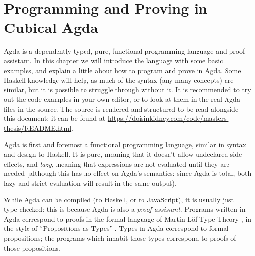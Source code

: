 \chapter{Programming and Proving in Cubical Agda} \label{agda-intro} Agda \citep{norellDependentlyTypedProgramming2008} is a dependently-typed, pure,
functional programming language and proof assistant.
In this chapter we will introduce the language with some basic examples, and
explain a little about how to program and prove in Agda.
Some Haskell knowledge will help, as much of the syntax (any many concepts) are
similar, but it is possible to struggle through without it.
It is recommended to try out the code examples in your own editor, or to look at
them in the real Agda files in the source.
The source is rendered and structured to be read alongside this document: it can
be found at \mbox{\url{https://doisinkidney.com/code/masters-thesis/README.html}}.

Agda is first and foremost a functional programming language, similar in syntax
and design to Haskell.
It is pure, meaning that it doesn't allow undeclared side effects, and
\emph{lazy}, meaning that expressions are not evaluated until they are needed
(although this has no effect on Agda's semantics: since Agda is total, both lazy
and strict evaluation will result in the same output).

While Agda can be compiled (to Haskell, or to JavaScript), it is usually just
type-checked: this is because Agda is also a \emph{proof assistant}.
Programs written in Agda correspond to proofs in the formal language of
Martin-Löf Type Theory \citep{martin-lofIntuitionisticTypeTheory1980}, in the
style of ``Propositions as Types'' \citep{wadlerPropositionsTypes2015}.
Types in Agda correspond to formal propositions; the programs which inhabit
those types correspond to proofs of those propositions.
\begin{figure}
  \centering
\end{figure}
